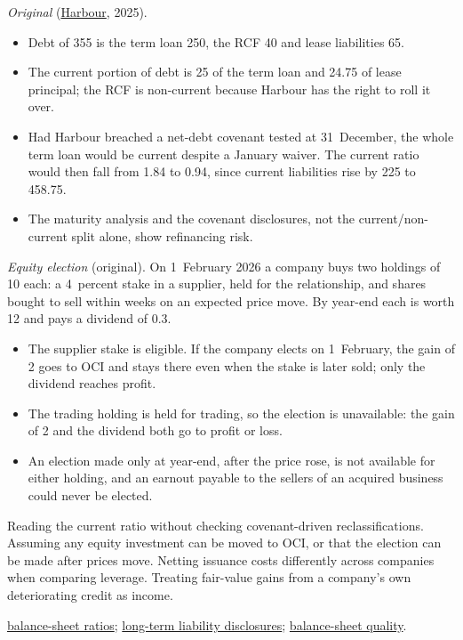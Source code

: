 \begin{qfmethod}
 \emph{Original} (\hyperref[ex:harbour-tools-statements]{Harbour}, 2025).
\begin{itemize}
\item Debt of 355 is the term loan 250, the RCF 40 and lease liabilities 65.
\item The current portion of debt is 25 of the term loan and 24.75 of lease principal; the RCF is non-current because Harbour has the right to roll it over.
\item Had Harbour breached a net-debt covenant tested at 31~December, the whole term loan would be current despite a January waiver. The current ratio would then fall from 1.84 to 0.94, since current liabilities rise by 225 to 458.75.
\item The maturity analysis and the covenant disclosures, not the current/non-current split alone, show refinancing risk.
\end{itemize}
\emph{Equity election} (original). On 1~February 2026 a company buys two holdings of 10 each: a 4~percent stake in a supplier, held for the relationship, and shares bought to sell within weeks on an expected price move. By year-end each is worth 12 and pays a dividend of 0.3.
\begin{itemize}
\item The supplier stake is eligible. If the company elects on 1~February, the gain of 2 goes to OCI and stays there even when the stake is later sold; only the dividend reaches profit.
\item The trading holding is held for trading, so the election is unavailable: the gain of 2 and the dividend both go to profit or loss.
\item An election made only at year-end, after the price rose, is not available for either holding, and an earnout payable to the sellers of an acquired business could never be elected.
\end{itemize}

 Reading the current ratio without checking covenant-driven reclassifications. Assuming any equity investment can be moved to OCI, or that the election can be made after prices move. Netting issuance costs differently across companies when comparing leverage. Treating fair-value gains from a company's own deteriorating credit as income.

 \hyperref[meth:balance-sheet-ratios]{balance-sheet ratios}; \hyperref[def:long-term-liability-compensation-disclosures]{long-term liability disclosures}; \hyperref[meth:cash-flow-balance-sheet-quality]{balance-sheet quality}.

\end{qfmethod}

